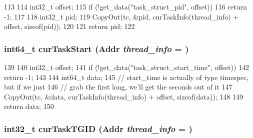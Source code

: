 \begin{DoxyCode}
113     {
114         int32_t offset;
115         if (!get_data("task_struct_pid", offset))
116             return -1;
117 
118         int32_t pid;
119         CopyOut(tc, &pid, curTaskInfo(thread_info) + offset, sizeof(pid));
120 
121         return pid;
122     }
\end{DoxyCode}
\hypertarget{classLinux_1_1ThreadInfo_aa1fc5d282b28d10354417f72a82a36c7}{
\subsubsection[{curTaskStart}]{\setlength{\rightskip}{0pt plus 5cm}int64\_\-t curTaskStart ({\bf Addr} {\em thread\_\-info} = {})}}
\label{classLinux_1_1ThreadInfo_aa1fc5d282b28d10354417f72a82a36c7}



\begin{DoxyCode}
139     {
140         int32_t offset;
141         if (!get_data("task_struct_start_time", offset))
142             return -1;
143 
144         int64_t data;
145         // start_time is actually of type timespec, but if we just
146         // grab the first long, we'll get the seconds out of it
147         CopyOut(tc, &data, curTaskInfo(thread_info) + offset, sizeof(data));
148 
149         return data;
150     }
\end{DoxyCode}
\hypertarget{classLinux_1_1ThreadInfo_a95f8711d141a94ab8f2b192bb58d6fc1}{
\subsubsection[{curTaskTGID}]{\setlength{\rightskip}{0pt plus 5cm}int32\_\-t curTaskTGID ({\bf Addr} {\em thread\_\-info} = {})}}
\label{classLinux_1_1ThreadInfo_a95f8711d141a94ab8f2b192bb58d6fc1}



